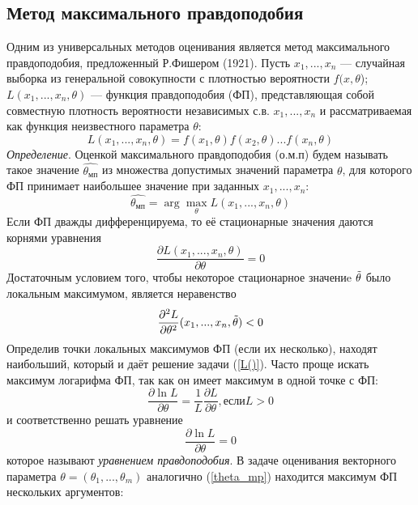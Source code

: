 \subsection{Метод максимального правдоподобия}
Одним из универсальных методов оценивания является метод максимального правдоподобия, предложенный Р.Фишером (1921).
Пусть $x_{1},...,x_{n}$ — случайная выборка из генеральной совокупности с плотностью вероятности $f(x,\theta$); $L(x_{1},... ,x_{n}, \theta)$ — функция правдоподобия (ФП), представляющая собой совместную плотность вероятности независимых с.в. $x_{1}, ... ,x_{n}$ и рассматриваемая как функция неизвестного параметра $\theta$:
\begin{equation}
L(x_{1},...,x_{n},\theta) = f(x_{1},\theta)f(x_{2},\theta)...f(x_{n}, \theta)
\label{L()}
\end{equation}
\textit{Определение}. Оценкой максимального правдоподобия (о.м.п) будем называть такое значение $\hat{\theta_{мп}}$ из множества допустимых значений параметра $\theta$, для которого ФП принимает наибольшее значение при заданных $x_{1},...,x_{n}$:
\begin{equation}
\hat{\theta_{мп}} = \arg \max_{\theta}L(x_{1},...,x_{n},\theta)
\label{theta_mp}
\end{equation}
Если ФП дважды дифференцируема, то её стационарные значения даются корнями уравнения
\begin{equation}
\frac{\partial L(x_{1},...,x_{n},\theta)}{\partial \theta} = 0
\label{eq_min}
\end{equation}
Достаточным условием того, чтобы некоторое стационарное значениe $\Tilde{\theta}$ было локальным максимумом, является неравенство
\begin{equation}
\frac{\partial^{2}L}{\partial \theta^{2}}(x_{1},...,x_{n},\Tilde{\theta}) < 0
\label{ineq_min}
\end{equation}
Определив точки локальных максимумов ФП (если их несколько), находят наибольший, который и даёт решение задачи (\ref{L()}).
Часто проще искать максимум логарифма ФП, так как он имеет максимум в одной точке с ФП:
\begin{equation}
\frac{\partial \ln L}{\partial \theta}=\frac{1}{L}\frac{\partial L}{\partial \theta}, если L > 0
\label{log_max}
\end{equation}
и соответственно решать уравнение
\begin{equation}
\frac{\partial \ln L}{\partial \theta}= 0
\label{log_m=0}
\end{equation}
которое называют \textit{уравнением правдоподобия}.
В задаче оценивания векторного параметра $\theta = (\theta_{1}, ... ,\theta_{m})$ аналогично (\ref{theta_mp}) находится максимум ФП нескольких аргументов: 
